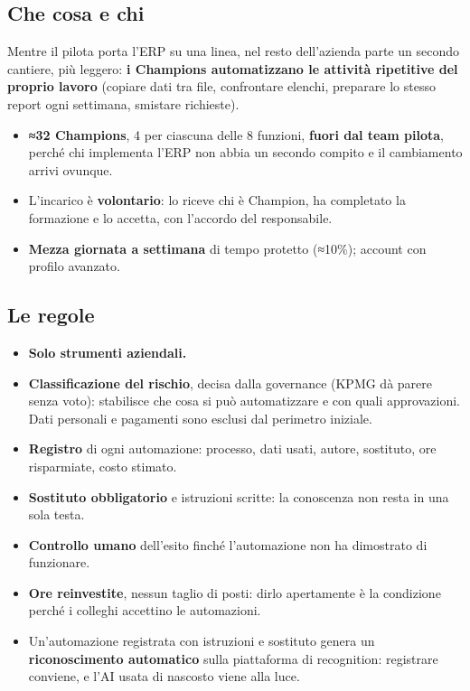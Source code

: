 \documentclass[11pt,a4paper]{article}
\begin{document}
\subsection{Che cosa e chi}\label{sec:11.1}
Mentre il pilota porta l'ERP su una linea, nel resto dell'azienda parte un secondo cantiere, più leggero: \textbf{i Champions automatizzano le attività ripetitive del proprio lavoro} (copiare dati tra file, confrontare elenchi, preparare lo stesso report ogni settimana, smistare richieste).
\begin{itemize}
\item \textbf{≈32 Champions}, 4 per ciascuna delle 8 funzioni, \textbf{fuori dal team pilota}, perché chi implementa l'ERP non abbia un secondo compito e il cambiamento arrivi ovunque.
\item L'incarico è \textbf{volontario}: lo riceve chi è Champion, ha completato la formazione e lo accetta, con l'accordo del responsabile.
\item \textbf{Mezza giornata a settimana} di tempo protetto (≈10\%); account con profilo avanzato.
\end{itemize}

\subsection{Le regole}\label{sec:11.2}
\begin{itemize}
\item \textbf{Solo strumenti aziendali.}
\item \textbf{Classificazione del rischio}, decisa dalla governance (KPMG dà parere senza voto): stabilisce che cosa si può automatizzare e con quali approvazioni. Dati personali e pagamenti sono esclusi dal perimetro iniziale.
\item \textbf{Registro} di ogni automazione: processo, dati usati, autore, sostituto, ore risparmiate, costo stimato.
\item \textbf{Sostituto obbligatorio} e istruzioni scritte: la conoscenza non resta in una sola testa.
\item \textbf{Controllo umano} dell'esito finché l'automazione non ha dimostrato di funzionare.
\item \textbf{Ore reinvestite}, nessun taglio di posti: dirlo apertamente è la condizione perché i colleghi accettino le automazioni.
\item Un'automazione registrata con istruzioni e sostituto genera un \textbf{riconoscimento automatico} sulla piattaforma di recognition: registrare conviene, e l'AI usata di nascosto viene alla luce.
\end{itemize}
\end{document}
